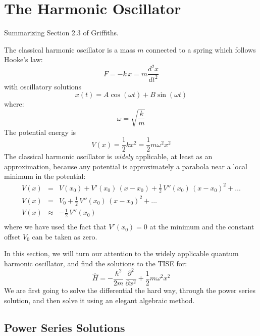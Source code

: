 \documentclass[12pt]{book}
\begin{document}
\section{The Harmonic Oscillator}

Summarizing Section 2.3 of Griffiths.

The classical harmonic oscillator is a mass $m$ connected to a spring which follows Hooke's law:
\begin{equation*}
F = -k \, x = m \frac{d^2x}{dt^2} 
\end{equation*}
with oscillatory solutions
\begin{equation*}
x(t) = A \cos(\omega t) + B \sin(\omega t)
\end{equation*}
where:
\begin{equation*}
\omega = \sqrt{\frac{k}{m}}
\end{equation*}
The potential energy is
\begin{equation*}
V(x) = \frac{1}{2}k x^2 = \frac{1}{2} m \omega^2 x^2
\end{equation*}
The classical harmonic oscillator is {\em widely} applicable, at least as an approximation, because any potential is approximately a parabola near a local minimum in the potential:
\begin{eqnarray*}
V(x) &=& V(x_0) + V'(x_0) \, (x-x_0) + \frac{1}{2}\,V''(x_0) \, (x-x_0)^2 + \ldots \\[5pt]
V(x) &=& V_0 + \frac{1}{2}\,V''(x_0) \, (x-x_0)^2 + \ldots \\[5pt]
V(x) &\approx& -\frac{1}{2}\,V''(x_0)\\
\end{eqnarray*}
where we have used the fact that $V'(x_0)=0$ at the minimum and the constant offset $V_0$ can be taken as zero.

In this section, we will turn our attention to the widely applicable quantum harmonic oscillator, and find the solutions to the TISE for:
\begin{equation*}
\hat{H} = -\frac{\hbar^2}{2m}\,\frac{\partial^2}{\partial x^2} + \frac{1}{2} m \omega^2 x^2
\end{equation*}
We are first going to solve the differential the hard way, through the power series solution, and then solve it using an elegant algebraic method.

\subsection{Power Series Solutions}
\end{document}
